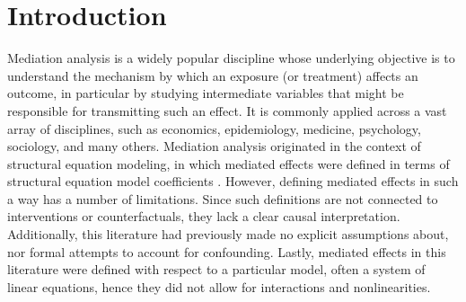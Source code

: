 \documentclass[12pt]{article}
\begin{document}
\newpage
{} %

\section{Introduction}
\label{sec:intro}
Mediation analysis is a widely popular discipline whose underlying objective is to understand the mechanism by which an exposure (or treatment) affects an outcome, in particular by studying intermediate variables that might be responsible for transmitting such an effect. It is commonly applied across a vast array of disciplines, such as economics, epidemiology, medicine, psychology,
sociology, and many others. Mediation analysis originated in the context of structural equation modeling, in which mediated effects were defined in terms of structural equation model coefficients \citep{wright1921correlation}. However, defining mediated effects in such a way has a number of limitations. Since such definitions are not connected to interventions or counterfactuals, they lack a clear causal interpretation. Additionally, this literature had previously made no explicit assumptions about, nor formal attempts to account for confounding. Lastly, mediated effects in this literature were defined with respect to a particular model, often a system of linear equations, hence they did not allow for interactions and nonlinearities. 
\end{document}
